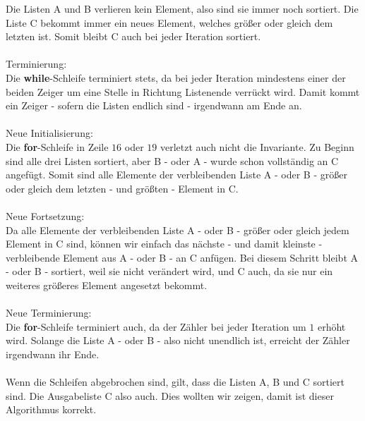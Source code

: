 \documentclass{article}
\begin{document}
\begin{enumerate}
    Die Listen A und B verlieren kein Element, also sind sie immer noch sortiert.
    Die Liste C bekommt immer ein neues Element, welches größer oder gleich dem letzten ist. Somit bleibt C auch bei jeder Iteration sortiert.\\
    \\
    Terminierung:\\
    Die \textbf{while}-Schleife terminiert stets, da bei jeder Iteration mindestens einer der beiden Zeiger um eine Stelle in Richtung Listenende verrückt wird.
    Damit kommt ein Zeiger - sofern die Listen endlich sind - irgendwann am Ende an.\\
    \\
    Neue Initialisierung:\\
    Die \textbf{for}-Schleife in Zeile $16$ oder $19$ verletzt auch nicht die Invariante.
    Zu Beginn sind alle drei Listen sortiert, aber B - oder A - wurde schon vollständig an C angefügt.
    Somit sind alle Elemente der verbleibenden Liste A - oder B - größer oder gleich dem letzten - und größten - Element in C.\\
    \\
    Neue Fortsetzung:\\
    Da alle Elemente der verbleibenden Liste A - oder B - größer oder gleich jedem Element in C sind, können wir einfach das nächste - und damit kleinste - verbleibende Element aus A - oder B - an C anfügen.
    Bei diesem Schritt bleibt A - oder B - sortiert, weil sie nicht verändert wird, und C auch, da sie nur ein weiteres größeres Element angesetzt bekommt.\\
    \\
    Neue Terminierung:\\
    Die \textbf{for}-Schleife terminiert auch, da der Zähler bei jeder Iteration um $1$ erhöht wird.
    Solange die Liste A - oder B - also nicht unendlich ist, erreicht der Zähler irgendwann ihr Ende.\\
    \\
    Wenn die Schleifen abgebrochen sind, gilt, dass die Listen A, B und C sortiert sind.
    Die Ausgabeliste C also auch.
    Dies wollten wir zeigen, damit ist dieser Algorithmus korrekt.\\
    \\
    

\end{enumerate}
\end{document}
